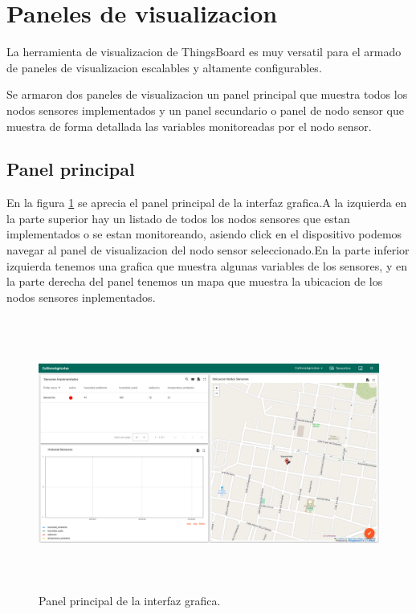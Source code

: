 \clearpage
\section{Paneles de visualizacion}
La herramienta de visualizacion de ThingsBoard es muy versatil para el armado de paneles de visualizacion escalables y altamente configurables.

Se armaron dos paneles de visualizacion un panel principal que muestra todos los nodos sensores implementados y un panel secundario o panel de nodo sensor que muestra de forma detallada las variables monitoreadas por el nodo sensor.
\subsection{Panel principal} 

En la figura \ref{fig:Panel principal} se aprecia el panel principal de la interfaz grafica.A la izquierda en la parte superior hay un listado de todos los nodos sensores que estan implementados o se estan monitoreando, asiendo click en el dispositivo podemos navegar al panel de visualizacion del nodo sensor seleccionado.En la parte inferior izquierda tenemos una grafica que muestra algunas variables de los sensores,
y en la parte derecha del panel tenemos un mapa que muestra la ubicacion de los nodos sensores inplementados.

\begin{figure}[h!]
  \centering
	\includegraphics[width=\textwidth, height=9cm]{./Figures/panel_principal.png}
  \caption{Panel principal de la interfaz grafica.}
	\label{fig:Panel principal}
\end{figure}

